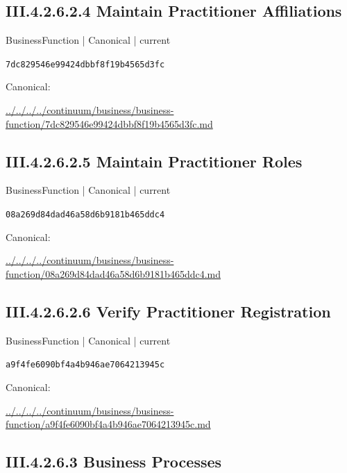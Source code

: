 \documentclass[10pt,a4paper]{article}
\begin{document}
\subsection*{III.4.2.6.2.4 Maintain Practitioner Affiliations}
\label{element-7dc829546e99424dbbf8f19b4565d3fc}
{\small BusinessFunction | Canonical | current}\par
\texttt{7dc829546e99424dbbf8f19b4565d3fc}\par
Canonical: \par
{\footnotesize\url{../../../../continuum/business/business-function/7dc829546e99424dbbf8f19b4565d3fc.md}}\par
\subsection*{III.4.2.6.2.5 Maintain Practitioner Roles}
\label{element-08a269d84dad46a58d6b9181b465ddc4}
{\small BusinessFunction | Canonical | current}\par
\texttt{08a269d84dad46a58d6b9181b465ddc4}\par
Canonical: \par
{\footnotesize\url{../../../../continuum/business/business-function/08a269d84dad46a58d6b9181b465ddc4.md}}\par
\subsection*{III.4.2.6.2.6 Verify Practitioner Registration}
\label{element-a9f4fe6090bf4a4b946ae7064213945c}
{\small BusinessFunction | Canonical | current}\par
\texttt{a9f4fe6090bf4a4b946ae7064213945c}\par
Canonical: \par
{\footnotesize\url{../../../../continuum/business/business-function/a9f4fe6090bf4a4b946ae7064213945c.md}}\par
\subsection*{III.4.2.6.3 Business Processes}
\end{document}
